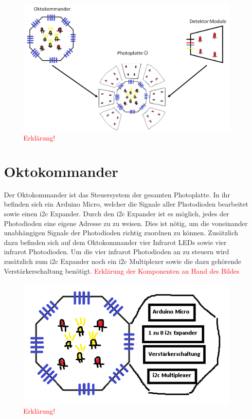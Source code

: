 \begin{figure}[h]
	\centering
	\includegraphics[scale=0.5]{figures/Photoplatte.png}
	\caption{\textcolor{red}{Erklärung!}}
	\label{fig:Fotoplatte}
\end{figure}


\section{Oktokommander}
\label{sec:Oktokommander}

Der Oktokommander ist das Steuersystem der gesamten Photoplatte. In ihr befinden sich ein Arduino Micro, welcher die Signale aller Photodioden bearbeitet sowie einen i2c Expander. Durch den i2c Expander ist es möglich, jedes der Photodioden eine eigene Adresse zu zu weisen. Dies ist nötig, um die voneinander unabhängigen Signale der Photodioden richtig zuordnen zu können. Zusätzlich dazu befinden sich auf dem Oktokommander vier Infrarot LEDs sowie vier infrarot Photodioden. Um die vier infrarot Photodioden an zu steuern wird zusätzlich zum i2c Expander noch ein i2c Multiplexer sowie die dazu gehörende Verstärkerschaltung benötigt. 
\textcolor{red}{Erklärung der Komponenten an Hand des Bildes}

\begin{figure}[h]
	\centering
	\includegraphics[scale=0.8]{figures/OktokommanderOffen.png}
	\caption{\textcolor{red}{Erklärung!}}
	\label{fig:OktokommanderOffen}
\end{figure}

